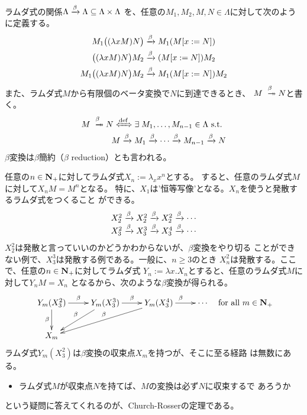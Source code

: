 {	\begin{definition}[ベータ変換]\label{def:ベータ変換} %
		ラムダ式の関係$\Lambda\xrightarrow[{}]{\beta}\Lambda\subseteq\Lambda\times\Lambda$
		を、任意の$M_1,M_2,M,N\in\Lambda$に対して次のように定義する。
		\begin{equation*}\begin{split}
			M_1\bigl((\lambda x M)N\bigr) &\xrightarrow[{}]{\beta} M_1(M[x:=N]) \\
			\bigl((\lambda x M)N\bigr)M_2 &\xrightarrow[{}]{\beta} (M[x:=N])M_2 \\
			M_1\bigl((\lambda x M)N\bigr)M_2 &\xrightarrow[{}]{\beta} M_1(M[x:=N])M_2 \\
		\end{split}\end{equation*}
		また、ラムダ式$M$から有限個のベータ変換で$N$に到達できるとき、
		$M\xtoto{\beta}N$と書く。
		\begin{equation*}\begin{split}
			M\xtoto{\beta}N \xiff{\dfn} \exists\; M_1,\dots,M_{n-1}\in\Lambda
			\text{ s.t. } \\
			M\xto{\beta}M_1\xto{\beta}\cdots\xto{\beta}M_{n-1}\xto{\beta}N
		\end{split}\end{equation*}
		$\beta$変換は$\beta$簡約（$\beta$ reduction）とも言われる。
	\end{definition} %

	任意の$n\in\mathbf{N}_+$に対してラムダ式$X_n:=\lambda_xx^n$とする。
	すると、任意のラムダ式$M$に対して$X_nM=M^n$となる。
	特に、$X_1$は'恒等写像'となる。$X_n$を使うと発散するラムダ式をつくること
	ができる。
	\begin{equation*}\begin{array}{rcll}
		X_2^2\xrightarrow[{}]{\beta}X_2^2\xrightarrow[{}]{\beta}X_2^2\xrightarrow[{}]{\beta}\cdots \\
		X_3^2\xrightarrow[{}]{\beta}X_3^3\xrightarrow[{}]{\beta}X_3^4\xrightarrow[{}]{\beta}\cdots \\
	\end{array}\end{equation*}
	$X_2^2$は発散と言っていいのかどうかわからないが、$\beta$変換をやり切る
	ことができない例で、$X_3^3$は発散する例である。一般に、$n\ge3$のとき
	$X_n^2$は発散する。ここで、任意の$n\in\mathbf{N}_+$に対してラムダ式
	$Y_n:=\lambda x.X_n$とすると、任意のラムダ式$M$に対して$Y_nM=X_n$
	となるから、次のような$\beta$変換が得られる。
	\begin{equation*}\xymatrix{
		Y_m(X_3^2) \ar[d]_\beta \ar[r]^\beta 
		& Y_m(X_3^3) \ar[dl]_\beta \ar[r]^\beta
		& Y_m(X_3^4) \ar[dll]_\beta \ar[r]^\beta
		& \cdots \\
		X_m
	} \quad\text{for all } m\in\sizen_+
	\end{equation*}
	ラムダ式$Y_m(X_3^2)$は$\beta$変換の収束点$X_m$を持つが、そこに至る経路
	は無数にある。
	\begin{itemize}\setlength{\itemsep}{-1mm} %
		\item ラムダ式$M$が収束点$N$を持てば、$M$の変換は必ず$N$に収束するで
		あろうか
	\end{itemize} %
	という疑問に答えてくれるのが、Church-Rosserの定理である。

}
